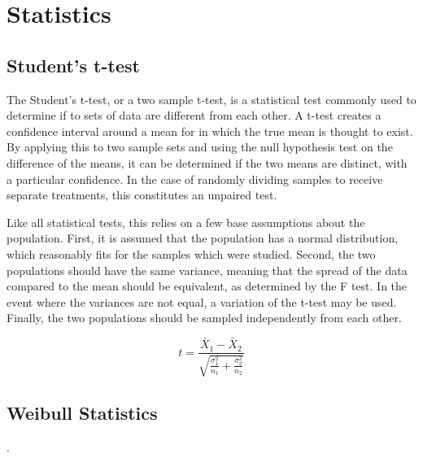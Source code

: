

\chapter{Statistics}

\section{Student's t-test}
The Student's t-test, or a two sample t-test, is a statistical test commonly used to determine if to sets of data are different from each other.
A t-test creates a confidence interval around a mean for in which the true mean is thought to exist.
By applying this to two sample sets and using the null hypothesis test on the difference of the means, it can be determined if the two means are distinct, with a particular confidence.
In the case of randomly dividing samples to receive separate treatments, this constitutes an unpaired test.

Like all statistical tests, this relies on a few base assumptions about the population.
First, it is assumed that the population has a normal distribution, which reasonably fits for the samples which were studied.
Second, the two populations should have the same variance, meaning that the spread of the data compared to the mean should be equivalent, as determined by the F test.
In the event where the variances are not equal, a variation of the t-test may be used.
Finally, the two populations should be sampled independently from each other.

\begin{equation}
    \label{eq:studentt}
    t=\frac{\bar{X}_1 - \bar{X}_2}{\sqrt{\frac{\sigma^2_1}{n_1}+\frac{\sigma_2^2}{n_2}}}
\end{equation}



\section{Weibull Statistics}
\label{app:weibull}.
